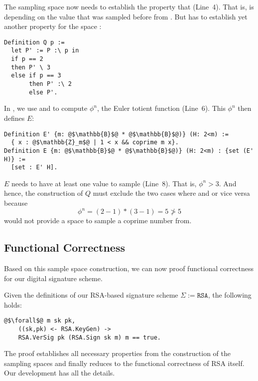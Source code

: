%
The sampling space  now needs to establish the
property that  (Line~4).
%
That is,  is depending on the value that was 
sampled before from .
%
But  has to establish yet another property for
the space :
%
\begin{verbatim}
Definition Q p :=
  let P' := P :\ p in
  if p == 2 
  then P' \ 3
  else if p == 3 
       then P' :\ 2
       else P'.
\end{verbatim}
%
In , we use  and 
to compute $\phi^n$, the Euler totient function (Line~6).
%
This $\phi^n$ then defines $E$:
%
\begin{verbatim}
Definition E' {m: @$\mathbb{B}$@ * @$\mathbb{B}$@)} (H: 2<m) :=
  { x : @$\mathbb{Z}_m$@ | 1 < x && coprime m x}.
Definition E {m: @$\mathbb{B}$@ * @$\mathbb{B}$@)} (H: 2<m) : {set (E' H)} := 
  [set : E' H].
\end{verbatim}
%
$E$ needs to have at least one value to sample  (Line~8).
%
That is, $\phi^n > 3$.
%
And hence, the construction of $Q$ must exclude the
two cases where  and  or vice versa
because 
\[
    \phi^n = (2-1) * (3-1) = 5 \ngtr 5
\]
would not provide a space to sample a coprime number  
from.
%

\subsection{Functional Correctness}

%
Based on this sample space construction, we can now
proof functional correctness for our digital signature scheme.
%
\begin{theorem}
    Given the definitions of our RSA-based signature scheme $\Sigma := \texttt{RSA}$,
    the following holds:
  \begin{center}
    \begin{minipage}{0.75\columnwidth}
    \begin{verbatim}
@$\forall$@ m sk pk,
    ((sk,pk) <- RSA.KeyGen) ->
    RSA.VerSig pk (RSA.Sign sk m) m == true.
    \end{verbatim}
    \end{minipage}
    \end{center}
\end{theorem}
\begin{IEEEproof}
    The proof establishes all necessary properties
    from the construction of the sampling spaces and
    finally reduces to the functional correctness
    of RSA itself.
    Our \coq development has all the details.
\end{IEEEproof}

